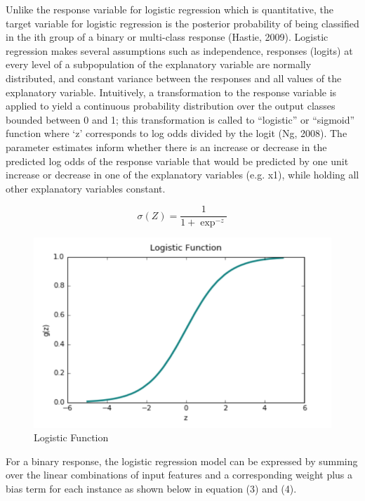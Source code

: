 \documentclass{llncs}
\begin{document}
Unlike the response variable for logistic regression which is quantitative, the target variable for logistic regression is the posterior probability of being classified in the ith group of a binary or multi-class response (Hastie, 2009). Logistic regression makes several assumptions such as independence, responses (logits) at every level of a subpopulation of the explanatory variable are normally distributed, and constant variance between the responses and all values of the explanatory variable. Intuitively, a transformation to the response variable is applied to yield a continuous probability distribution over the output classes bounded between 0 and 1; this transformation is called to “logistic” or “sigmoid” function where ‘z’ corresponds to log odds divided by the logit (Ng, 2008). The parameter estimates inform whether there is an increase or decrease in the predicted log odds of the response variable that would be predicted by one unit increase or decrease in one of the explanatory variables (e.g. x1), while holding all other explanatory variables constant.

\begin{equation}
\sigma(Z) = \frac{1}{1+\exp^{-z}}
\end{equation}


\begin{figure}
\centering
\includegraphics[scale=1.0]{sigmoid.png}
\caption{Logistic Function}
\end{figure}

For a binary response, the logistic regression model can be expressed by summing over the linear combinations of input features and a corresponding weight plus a bias term for each instance as shown below in equation (3) and (4).
\end{document}
